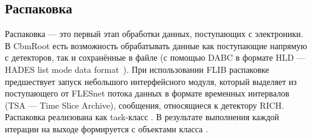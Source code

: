 

\subsection{Распаковка}\label{sec:secUnpacking}

Распаковка --- это первый этап обработки данных, поступающих с электроники. В CbmRoot есть возможность обрабатывать данные как поступающие напрямую с детекторов, так и сохранённые в файле (с помощью DABC в формате HLD --- HADES list mode data format~\cite{HLD}). При использовании FLIB распаковке предшествует запуск небольшого интерфейсного модуля, который выделяет из поступающего от FLESnet потока данных в формате временных интервалов (TSA --- Time Slice Archive), сообщения, относящиеся к детектору RICH. Распаковка реализована как task-класс . В результате выполнения каждой итерации на выходе формируется  с объектами класса .

